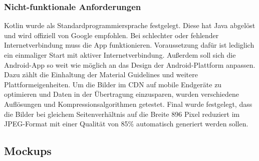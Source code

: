\subsubsection{Nicht-funktionale Anforderungen}
Kotlin wurde als Standardprogrammiersprache festgelegt. Diese hat Java abgelöst und wird offiziell von Google empfohlen. Bei schlechter oder fehlender Internetverbindung muss die App funktionieren. Voraussetzung dafür ist lediglich ein einmaliger Start mit aktiver Internetverbindung. Außerdem soll sich die Android-App so weit wie möglich an das Design der Android-Plattform anpassen. Dazu zählt die Einhaltung der Material Guidelines und weitere Plattformeigenheiten. Um die Bilder im \gls{CDN} auf mobile Endgeräte zu optimieren und Daten in der Übertragung einzusparen, wurden verschiedene Auflösungen und Kompressionsalgorithmen getestet. Final wurde festgelegt, dass die Bilder bei gleichem Seitenverhältnis auf die Breite 896 Pixel reduziert im \gls{JPEG}-Format mit einer Qualität von {85\%} automatisch generiert werden sollen.

\FloatBarrier
\subsection{Mockups}
\label{sec:mockups}

